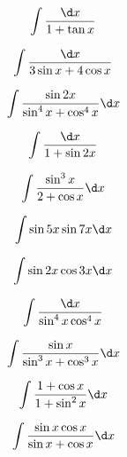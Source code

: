 \begin{question}
    \begin{equation*}
        \int \frac{\d x}{1 + \tan x}
    \end{equation*}
\end{question}

\begin{question}
    \begin{equation*}
        \int \frac{\d x}{3\sin x + 4\cos x}
    \end{equation*}
\end{question}

\begin{question}
    \begin{equation*}
        \int \frac{\sin 2x}{\sin^4 x + \cos^4 x} \d x
    \end{equation*}
\end{question}

\begin{question}
    \begin{equation*}
        \int \frac{\d x}{1 + \sin 2x}
    \end{equation*}
\end{question}

\begin{question}
    \begin{equation*}
        \int \frac{\sin^3 x}{2 + \cos x} \d x
    \end{equation*}
\end{question}

\begin{question}
    \begin{equation*}
        \int \sin 5x \sin 7x \d x
    \end{equation*}
\end{question}

\begin{question}
    \begin{equation*}
        \int \sin 2x \cos 3x \d x
    \end{equation*}
\end{question}

\begin{question}
    \begin{equation*}
        \int \frac{\d x}{\sin^4 x \cos^4 x}
    \end{equation*}
\end{question}

\begin{question}
    \begin{equation*}
        \int \frac{\sin x}{\sin^3 x + \cos^3 x} \d x
    \end{equation*}
\end{question}

\begin{question}
    \begin{equation*}
        \int \frac{1 + \cos x}{1 + \sin^2 x} \d x
    \end{equation*}
\end{question}

\begin{question}
    \begin{equation*}
        \int \frac{\sin x \cos x}{\sin x + \cos x} \d x
    \end{equation*}
\end{question}
